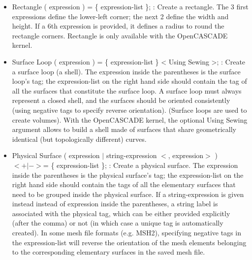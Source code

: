 \documentclass[dvipdfmx, 9pt, a4paper]{article}
\numberwithin{equation}{section}
\begin{document}
\begin{itemize}
\item Rectangle ( expression ) = \{ expression-list \}; : Create a rectangle. The 3 first expressions define the lower-left corner; the next 2
define the width and height. If a 6th expression is provided, it defines a radius to round the rectangle corners. Rectangle is only available with the OpenCASCADE kernel.
\item Surface Loop ( expression ) = \{ expression-list \} < Using Sewing >; : Create a surface loop (a shell). The expression inside the parentheses is the surface loop's tag; the expression-list on the right hand side should contain the tag of all the surfaces that constitute the surface loop. A surface loop must always represent a closed shell, and the surfaces should be oriented consistently (using negative tags to specify reverse orientation). (Surface loops are used to create volumes). With the OpenCASCADE kernel, the optional Using Sewing argument allows to build a shell made of surfaces that share geometrically identical (but topologically different) curves.
\item Physical Surface ( expression $|$ string-expression $<$, expression$>$ ) $<+|->$= \{ expression-list \}; : Create a physical surface. The expression inside the parentheses is the physical surface's tag; the expression-list on the right hand side should contain the tags of all the elementary surfaces that need to be grouped inside the physical surface. If a string-expression is given instead instead of expression inside the parentheses, a string label is associated with the physical tag, which can be either provided explicitly (after the comma) or not (in which case a unique tag is automatically created). In some mesh file formats (e.g. MSH2), specifying negative tags in the expression-list will reverse the orientation of the mesh elements belonging to the corresponding elementary surfaces in the saved mesh file.
\end{itemize}
\end{document}
